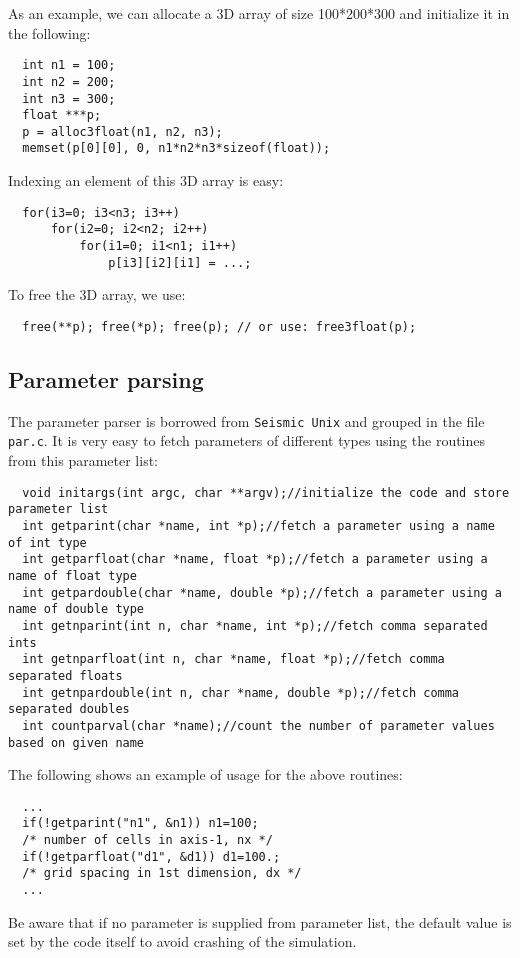 \documentclass[10pt]{article}
\begin{document}
As an example, we can allocate a 3D array of size 100*200*300 and initialize it in the following:
\begin{verbatim}
  int n1 = 100;
  int n2 = 200;
  int n3 = 300;
  float ***p;
  p = alloc3float(n1, n2, n3);
  memset(p[0][0], 0, n1*n2*n3*sizeof(float));
\end{verbatim}
Indexing an element of this 3D array is easy: 
\begin{verbatim}
  for(i3=0; i3<n3; i3++)
      for(i2=0; i2<n2; i2++)
          for(i1=0; i1<n1; i1++)
              p[i3][i2][i1] = ...;
\end{verbatim}
To free the 3D array, we use:
\begin{verbatim}
  free(**p); free(*p); free(p); // or use: free3float(p);
\end{verbatim}

\subsection{Parameter parsing}

The parameter parser is borrowed from \texttt{Seismic Unix} and grouped in the file \verb|par.c|. It is very easy to fetch parameters of different types using the routines from this parameter list:
\begin{verbatim}
  void initargs(int argc, char **argv);//initialize the code and store parameter list
  int getparint(char *name, int *p);//fetch a parameter using a name of int type
  int getparfloat(char *name, float *p);//fetch a parameter using a name of float type
  int getpardouble(char *name, double *p);//fetch a parameter using a name of double type
  int getnparint(int n, char *name, int *p);//fetch comma separated ints
  int getnparfloat(int n, char *name, float *p);//fetch comma separated floats
  int getnpardouble(int n, char *name, double *p);//fetch comma separated doubles
  int countparval(char *name);//count the number of parameter values based on given name
\end{verbatim}
The following shows an example of usage for the above routines:
\begin{verbatim}
  ...
  if(!getparint("n1", &n1)) n1=100; 
  /* number of cells in axis-1, nx */
  if(!getparfloat("d1", &d1)) d1=100.;
  /* grid spacing in 1st dimension, dx */
  ...
\end{verbatim}
Be aware that if no parameter is supplied from parameter list, the default value is set by the code itself to avoid crashing of the simulation.
\end{document}
